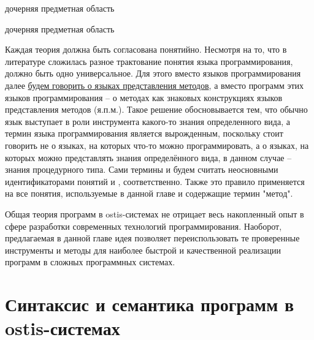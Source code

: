 \begin{SCn}
\begin{scnrelfromlist}{дочерняя предметная область}
    \begin{scnindent}
        \begin{scnrelfromlist}{дочерняя предметная область}
        \end{scnrelfromlist}
    \end{scnindent}
\end{scnrelfromlist}
\end{SCn}

Каждая теория должна быть согласована понятийно. Несмотря на то, что в литературе сложилась разное трактование понятия языка программирования, должно быть одно универсальное. Для этого вместо языков программирования далее \underline{будем говорить о языках представления методов}, а вместо программ этих языков программирования -- о методах как знаковых конструкциях языков представления методов (я.п.м.). Такое решение обосновывается тем, что обычно язык выступает в роли инструмента какого-то знания определенного вида, а термин языка программирования является вырожденным, поскольку стоит говорить не о языках, на которых что-то можно программировать, а о языках, на которых можно представлять знания определённого вида, в данном случае -- знания процедурного типа. Сами термины  и  будем считать неосновными идентификаторами понятий  и , соответственно. Также это правило применяется на все понятия, используемые в данной главе и содержащие термин "метод".

Общая теория программ в ostis-системах не отрицает весь накопленный опыт в сфере разработки современных технологий программирования. Наоборот, предлагаемая в данной главе идея позволяет переиспользовать те проверенные инструменты и методы для наиболее быстрой и качественной реализации программ в сложных программных системах.

\section{Синтаксис и семантика программ в ostis-системах}
\label{sec_programs_method_syntax_and_semantic}

